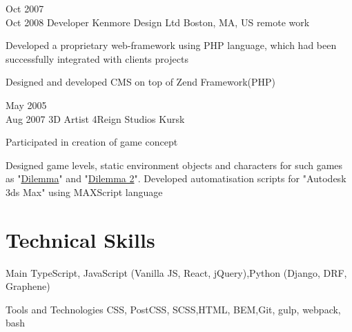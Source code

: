 \documentclass[11pt,a4paper,sans]{moderncv}
\newcommand{\lang}[2]{#2}
\begin{document}
\cventry
    {\lang{Окт}{Oct} 2007\\\lang{Окт}{Oct} 2008}
    {\lang
        {Программист}
        {Developer}}
    {Kenmore Design Ltd}
    {\lang
        {Бостон, Массачусетс, США}
        {Boston, MA, US}}
    {\lang
        {удалённая работа}
        {remote work}}
    {}

\cvlistitem
    {\lang
        {Разработал веб-фреймворк для создания сайтов на языке PHP, который был успешно использован при создании проектов клиентов компании.}
        {Developed a proprietary web-framework using PHP language, which had been successfully integrated with clients projects}}

\cvlistitem
    {\lang
        {Разработал CMS на основе Zend Framework(PHP).}
        {Designed and developed CMS on top of Zend Framework(PHP)}}

\cventry
    {\lang{Май}{May} 2005\\\lang{Авг}{Aug} 2007}
    {\lang
        {3D художник}
        {3D Artist}}
    {4Reign Studios}
    {\lang
        {Курск}
        {Kursk}}
    {}
    {}

\cvlistitem
    {\lang
        {Принимал участие в создании концепции проекта}
        {Participated in creation of game concept}}

\cvlistitem
    {\lang
        {Занимался дизайном уровней, моделированием статичных объектов и персонажей для игр «\href{https://www.igromania.ru/game/3494/Dilemma.html}{Dilemma}» и «\href{https://www.igromania.ru/game/3959/Dilemma_2.html}{Dilemma 2}», писал пользовательские утилиты для пакета 3D-моделирования Autodesk 3ds MAX на языке MAXScript.}
        {Designed game levels, static environment objects and characters for such games as "\href{https://www.igromania.ru/game/3494/Dilemma.html}{Dilemma}" and "\href{https://www.igromania.ru/game/3959/Dilemma_2.html}{Dilemma 2}". Developed automatisation scripts for "Autodesk 3ds Max" using MAXScript language }}

\section
    {\lang
        {Технические навыки}
        {Technical Skills}}

\cvline
    {\lang
        {Главное}
        {Main}}
    {TypeScript, JavaScript (Vanilla JS, React, jQuery),\newline Python (Django, DRF, Graphene)}

\cvline
    {\lang
        {Использую инструменты и технологии}
        {Tools and Technologies}}
    {CSS, PostCSS, SCSS,\newline HTML, BEM,\newline Git, gulp, webpack, bash}
\end{document}
